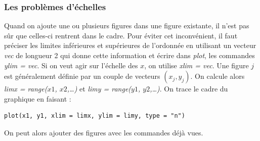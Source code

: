 \subsubsection{Les problèmes d'échelles}
Quand on ajoute une ou plusieurs figures dans une figure existante, il n'est pas sûr que celles-ci rentrent dans le cadre. Pour éviter cet inconvénient, il faut préciser les limites inférieures et supérieures de l'ordonnée en utilisant un vecteur \textit{vec} de longueur 2 qui donne cette information et écrire dans \textit{plot}, les commandes \textit{ylim = vec}. Si on veut agir sur l'échelle des $x$, on utilise \textit{xlim = vec}.\newline
Une figure $j$ est généralement définie par un couple de vecteurs $(x_{j},y_{j})$. On calcule alors \textit{limx = range($x1$, $x2$,\dots)} et \textit{limy = range($y1$, $y2$,\dots)}.\newline
On trace le cadre du graphique en faisant :
\begin{lstlisting}[language=html]
plot(x1, y1, xlim = limx, ylim = limy, type = "n")
\end{lstlisting}
On peut alors ajouter des figures avec les commandes déjà vues.

